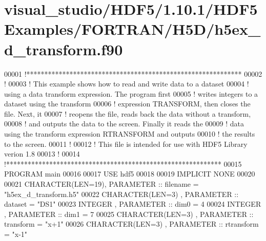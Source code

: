 \hypertarget{visual__studio_2_h_d_f5_21_810_81_2_h_d_f5_examples_2_f_o_r_t_r_a_n_2_h5_d_2h5ex__d__transform_8f90_source}{}\section{visual\+\_\+studio/\+H\+D\+F5/1.10.1/\+H\+D\+F5\+Examples/\+F\+O\+R\+T\+R\+A\+N/\+H5\+D/h5ex\+\_\+d\+\_\+transform.f90}
\label{visual__studio_2_h_d_f5_21_810_81_2_h_d_f5_examples_2_f_o_r_t_r_a_n_2_h5_d_2h5ex__d__transform_8f90_source}

\begin{DoxyCode}
00001 \textcolor{comment}{!************************************************************}
00002 \textcolor{comment}{!}
00003 \textcolor{comment}{!  This example shows how to read and write data to a dataset}
00004 \textcolor{comment}{!  using a data transform expression.  The program first}
00005 \textcolor{comment}{!  writes integers to a dataset using the transform}
00006 \textcolor{comment}{!  expression TRANSFORM, then closes the file.  Next, it}
00007 \textcolor{comment}{!  reopens the file, reads back the data without a transform,}
00008 \textcolor{comment}{!  and outputs the data to the screen.  Finally it reads the}
00009 \textcolor{comment}{!  data using the transform expression RTRANSFORM and outputs}
00010 \textcolor{comment}{!  the results to the screen.}
00011 \textcolor{comment}{!}
00012 \textcolor{comment}{!  This file is intended for use with HDF5 Library verion 1.8}
00013 \textcolor{comment}{!}
00014 \textcolor{comment}{!************************************************************}
00015 \textcolor{keyword}{PROGRAM} main
00016 
00017   \textcolor{keywordtype}{USE }hdf5
00018 
00019   \textcolor{keywordtype}{IMPLICIT NONE}
00020 
00021   \textcolor{keywordtype}{CHARACTER(LEN=19)}, \textcolor{keywordtype}{PARAMETER} :: filename = \textcolor{stringliteral}{"h5ex\_d\_transform.h5"}
00022   \textcolor{keywordtype}{CHARACTER(LEN=3)} , \textcolor{keywordtype}{PARAMETER} :: dataset  = \textcolor{stringliteral}{"DS1"}
00023   \textcolor{keywordtype}{INTEGER}          , \textcolor{keywordtype}{PARAMETER} :: dim0     = 4
00024   \textcolor{keywordtype}{INTEGER}          , \textcolor{keywordtype}{PARAMETER} :: dim1     = 7
00025   \textcolor{keywordtype}{CHARACTER(LEN=3)} , \textcolor{keywordtype}{PARAMETER} :: transform = \textcolor{stringliteral}{"x+1"}
00026   \textcolor{keywordtype}{CHARACTER(LEN=3)} , \textcolor{keywordtype}{PARAMETER} :: rtransform = \textcolor{stringliteral}{"x-1"}

\end{DoxyCode}
